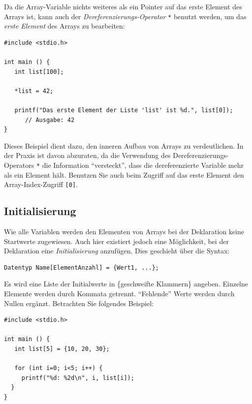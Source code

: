 Da die Array-Variable nichts weiteres als ein Pointer auf das erste Element des Arrays ist, kann auch der \emph{Dereferenzierungs-Operator} \texttt{*} benutzt werden, um das \emph{erste Element} des Arrays zu bearbeiten:

\begin{codebox}
\begin{verbatim}
#include <stdio.h>

int main () {
   int list[100];

   *list = 42;

   printf("Das erste Element der Liste 'list' ist %d.", list[0]);
      // Ausgabe: 42
}
\end{verbatim}
\end{codebox}

Dieses Beispiel dient dazu, den inneren Aufbau von Arrays zu verdeutlichen. In der Praxis ist davon abzuraten, da die Verwendung des Dereferenzierungs-Operators \texttt{*} die Information \enquote{versteckt}, dass die dereferenzierte Variable mehr als ein Element hält. Benutzen Sie auch beim Zugriff auf das erste Element den Array-Index-Zugriff \texttt{[0]}.

\subsection{Initialisierung} \label{sec:arrayInit}
Wie alle Variablen werden den Elementen von Arrays bei der Deklaration keine Startwerte zugewiesen. Auch hier existiert jedoch eine Möglichkeit, bei der Deklaration eine \emph{Initialisierung} anzufügen. Dies geschieht über die Syntax:

\begin{codebox}
\begin{verbatim}
Datentyp Name[ElementAnzahl] = {Wert1, ...};
\end{verbatim}
\end{codebox}

Es wird eine Liste der Initialwerte in \{geschweifte Klammern\} angeben. Einzelne Elemente werden durch Kommata getrennt. \enquote{Fehlende} Werte werden durch Nullen ergänzt. Betrachten Sie folgendes Beispiel:

\begin{codebox}
\begin{verbatim}
#include <stdio.h>

int main () {
   int list[5] = {10, 20, 30};

   for (int i=0; i<5; i++) {
     printf("%d: %2d\n", i, list[i]);
  }
}
\end{verbatim}
\end{codebox}

